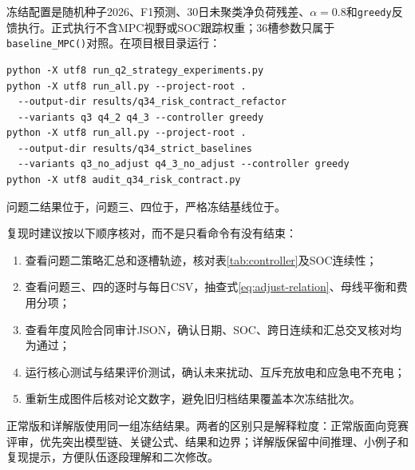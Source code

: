 \documentclass[UTF8,fontset=fandol,a4paper,11pt]{ctexart}
\begin{document}
冻结配置是随机种子2026、F1预测、30日未聚类净负荷残差、\(\alpha=0.8\)和\texttt{greedy}反馈执行。正式执行不含MPC视野或SOC跟踪权重；36槽参数只属于\texttt{baseline\_MPC()}对照。在项目根目录运行：
\begin{verbatim}
python -X utf8 run_q2_strategy_experiments.py
python -X utf8 run_all.py --project-root .
  --output-dir results/q34_risk_contract_refactor
  --variants q3 q4_2 q4_3 --controller greedy
python -X utf8 run_all.py --project-root .
  --output-dir results/q34_strict_baselines
  --variants q3_no_adjust q4_3_no_adjust --controller greedy
python -X utf8 audit_q34_risk_contract.py
\end{verbatim}
问题二结果位于，问题三、四位于，严格冻结基线位于。

复现时建议按以下顺序核对，而不是只看命令有没有结束：
\begin{enumerate}[label=（\arabic*）]
  \item 查看问题二策略汇总和逐槽轨迹，核对表\ref{tab:controller}及SOC连续性；
  \item 查看问题三、四的逐时与每日CSV，抽查式\eqref{eq:adjust-relation}、母线平衡和费用分项；
  \item 查看年度风险合同审计JSON，确认日期、SOC、跨日连续和汇总交叉核对均为通过；
  \item 运行核心测试与结果评价测试，确认未来扰动、互斥充放电和应急电不充电；
  \item 重新生成图件后核对论文数字，避免旧归档结果覆盖本次冻结批次。
\end{enumerate}

正常版和详解版使用同一组冻结结果。两者的区别只是解释粒度：正常版面向竞赛评审，优先突出模型链、关键公式、结果和边界；详解版保留中间推理、小例子和复现提示，方便队伍逐段理解和二次修改。
\end{document}
